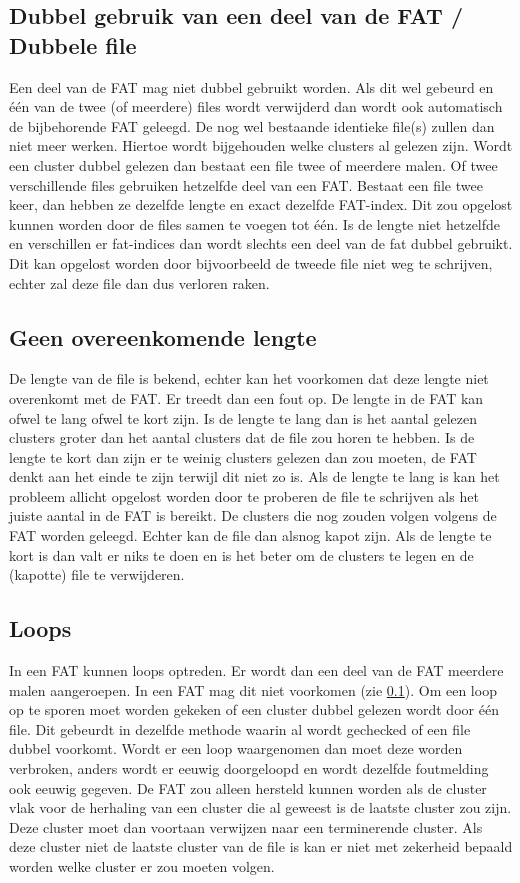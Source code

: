 \documentclass[11pt]{article}
\begin{document}
	\subsection{Dubbel gebruik van een deel van de FAT / Dubbele file}\label{sec:dubbel}
	Een deel van de FAT mag niet dubbel gebruikt worden. Als dit wel gebeurd en \'e\'en van de twee (of meerdere) files wordt verwijderd dan wordt ook automatisch de bijbehorende FAT geleegd. De nog wel bestaande identieke file(s) zullen dan niet meer werken. Hiertoe wordt bijgehouden welke clusters al gelezen zijn. Wordt een cluster dubbel gelezen dan bestaat een file twee of meerdere malen. Of twee verschillende files gebruiken hetzelfde deel van een FAT. Bestaat een file twee keer, dan hebben ze dezelfde lengte en exact dezelfde FAT-index. Dit zou opgelost kunnen worden door de files samen te voegen tot \'e\'en. Is de lengte niet hetzelfde en verschillen er fat-indices dan wordt slechts een deel van de fat dubbel gebruikt. Dit kan opgelost worden door bijvoorbeeld de tweede file niet weg te schrijven, echter zal deze file dan dus verloren raken. 

	\subsection{Geen overeenkomende lengte}\label{sec:lengte}
	De lengte van de file is bekend, echter kan het voorkomen dat deze lengte niet overenkomt met de FAT. Er treedt dan een fout op. De lengte in de FAT kan ofwel te lang ofwel te kort zijn. Is de lengte te lang dan is het aantal gelezen clusters groter dan het aantal clusters dat de file zou horen te hebben. Is de lengte te kort dan zijn er te weinig clusters gelezen dan zou moeten, de FAT denkt aan het einde te zijn terwijl dit niet zo is. Als de lengte te lang is kan het probleem allicht opgelost worden door te proberen de file te schrijven als het juiste aantal in de FAT is bereikt. De clusters die nog zouden volgen volgens de FAT worden geleegd. Echter kan de file dan alsnog kapot zijn. Als de lengte te kort is dan valt er niks te doen en is het beter om de clusters te legen en de (kapotte) file te verwijderen.

	\subsection{Loops}\label{sec:loops}
	In een FAT kunnen loops optreden. Er wordt dan een deel van de FAT meerdere malen aangeroepen. In een FAT mag dit niet voorkomen (zie \ref{sec:dubbel}). Om een loop op te sporen moet worden gekeken of een cluster dubbel gelezen wordt door \'e\'en file. Dit gebeurdt in dezelfde methode waarin al wordt gechecked of een file dubbel voorkomt. Wordt er een loop waargenomen dan moet deze worden verbroken, anders wordt er eeuwig doorgeloopd en wordt dezelfde foutmelding ook eeuwig gegeven. De FAT zou alleen hersteld kunnen worden als de cluster vlak voor de herhaling van een cluster die al geweest is de laatste cluster zou zijn. Deze cluster moet dan voortaan verwijzen naar een terminerende cluster. Als deze cluster niet de laatste cluster van de file is kan er niet met zekerheid bepaald worden welke cluster er zou moeten volgen.
\end{document}
